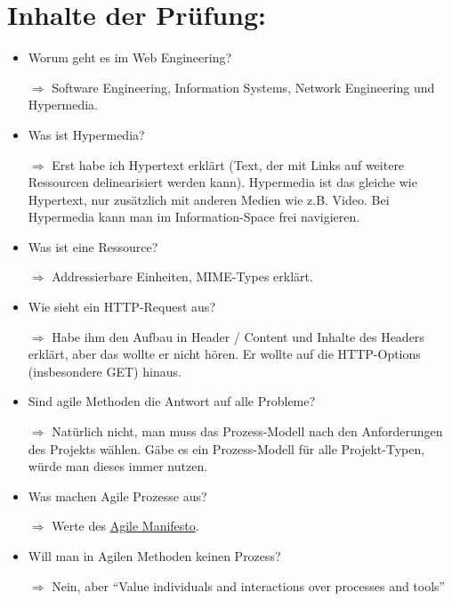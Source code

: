 \documentclass[a4paper]{article}
\begin{document}
\section*{Inhalte der Prüfung:}


    \begin{itemize}
        \item Worum geht es im Web Engineering?
        \item[$\Rightarrow$] Software Engineering, Information Systems, Network Engineering und Hypermedia.
        \item Was ist Hypermedia?
        \item[$\Rightarrow$] Erst habe ich Hypertext erklärt (Text, der mit Links auf weitere Ressourcen delinearisiert werden kann).
             Hypermedia ist das gleiche wie Hypertext, nur zusätzlich mit anderen Medien wie z.B. Video. 
             Bei Hypermedia kann man im Information-Space frei navigieren.
        \item Was ist eine Ressource?
        \item[$\Rightarrow$] Addressierbare Einheiten, MIME-Types erklärt.
        \item Wie sieht ein HTTP-Request aus?
        \item[$\Rightarrow$] Habe ihm den Aufbau in Header / Content und Inhalte des
              Headers erklärt, aber das wollte er nicht hören. Er
              wollte auf die HTTP-Options (insbesondere GET) hinaus.
        \item Sind agile Methoden die Antwort auf alle Probleme?
        \item[$\Rightarrow$] Natürlich nicht, man muss das Prozess-Modell 
              nach den Anforderungen des Projekts wählen. Gäbe es ein
              Prozess-Modell für alle Projekt-Typen, würde man dieses
              immer nutzen.
        \item Was machen Agile Prozesse aus?
        \item[$\Rightarrow$] Werte des \href{http://agilemanifesto.org/}{Agile Manifesto}.
        \item Will man in Agilen Methoden keinen Prozess?
        \item[$\Rightarrow$] Nein, aber "`Value individuals and interactions over processes and tools"'
    \end{itemize}
\end{document}
